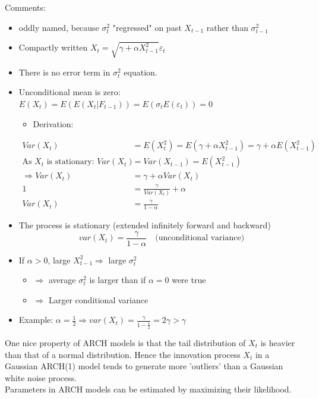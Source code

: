 \noindent 
Comments: 
\begin{itemize}
    \item oddly named, because $\sigma_t^2$ "regressed" on past $X_{t-1}$ rather than $\sigma_{t-1}^2$
    \item Compactly written $X_t=\sqrt{\gamma+ \alpha X_{t-1}^2}\varepsilon_t$
    \item There is no error term in $\sigma_t^2$ equation.
    \item Unconditional mean is zero: $E(X_t)=E(E(X_t|F_{t-1})) = E(\sigma_t E(\varepsilon_t))=0 $
\begin{itemize}
    \item Derivation:
\end{itemize}
    \begin{align*}
        Var(X_t)&=E(X_t^2) = E(\gamma + \alpha X_{t-1}^2) = \gamma + \alpha E(X_{t-1}^2) \\
        \text{As $X_t$ is stationary: } Var(X_t)&=Var(X_{t-1})=E(X_{t-1}^2) \\
        \Rightarrow Var(X_t)&= \gamma + \alpha Var(X_t) \\
        1&= \frac{\gamma}{Var(X_t)} + \alpha \\
        Var(X_t)&=\frac{\gamma}{1-\alpha}
    \end{align*}
    \item The process is stationary (extended infinitely forward and backward)
    \[var(X_t)=\frac{\gamma}{1-\alpha} \quad \text{(unconditional variance)}\]
    \item If $\alpha>0$, large $X_{t-1}^2 \Rightarrow$ large $\sigma_t^2$
    \begin{itemize}
        \item[] $\Rightarrow$ average $\sigma_t^2$ is larger than if $\alpha=0$ were true
        \item[] $\Rightarrow$ Larger conditional variance 
    \end{itemize}
    \item Example: $\alpha=\frac{1}{2} \Rightarrow var(X_t)=\frac{\gamma}{1-\frac{1}{2}} = 2\gamma> \gamma$ 
\end{itemize}
One nice property of ARCH models is that the tail distribution of $X_t$ is heavier than that of a normal distribution. Hence the innovation process $X_t$ in a Gaussian ARCH(1) model tends to generate more 'outliers' than a Gaussian white noise process.\\

\noindent
Parameters in ARCH models can be estimated by maximizing their likelihood. \\

